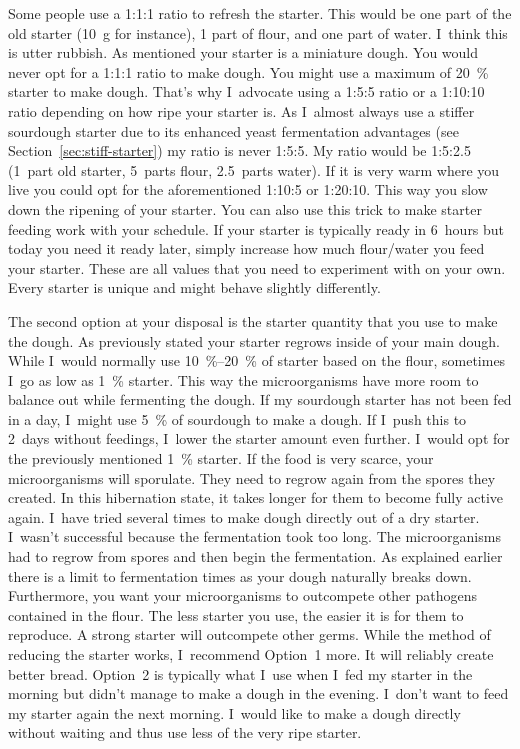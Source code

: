 Some people use a 1:1:1 ratio to refresh the starter. This would
be one part of the old starter (\qty{10}{\gram} for instance), 1 part of flour,
and one part of water. I~think this is utter rubbish. As mentioned
your starter is a miniature dough. You would never opt for a 1:1:1 ratio to
make dough. You might use a maximum of \qty{20}{\percent} starter to
make dough. That's why I~advocate using a 1:5:5 ratio or a
1:10:10 ratio depending on how ripe your starter is. As I~almost
always use a stiffer sourdough starter due to its enhanced
yeast fermentation advantages (see Section~\ref{sec:stiff-starter})
my ratio is never 1:5:5. My ratio would be 1:5:2.5 (1~part old starter,
5~parts flour, 2.5~parts water). If it is very warm where you live
you could opt for the aforementioned 1:10:5 or 1:20:10. This
way you slow down the ripening of your starter. You can also use this
trick to make starter feeding work with your schedule.
If your starter is typically ready in 6~hours but today you need it
ready later, simply increase how much flour/water you feed your starter.
These are all values that you need to experiment with on your own.
Every starter is unique and might behave slightly differently.

The second option at your disposal is the starter quantity that
you use to make the dough. As previously stated your starter
regrows inside of your main dough. While I~would normally use
\qtyrange{10}{20}{\percent} of starter based on the flour, sometimes I~go
as low as \qty{1}{\percent} starter. This way the microorganisms have
more room to balance out while fermenting the dough. If my sourdough
starter has not been fed in a day, I~might use \qty{5}{\percent} of sourdough
to make a dough. If I~push this to 2~days without feedings,
I~lower the starter amount even further. I~would opt for the
previously mentioned \qty{1}{\percent} starter. If the food is very scarce,
your microorganisms will sporulate. They need to regrow again
from the spores they created. In this hibernation state, it takes
longer for them to become fully active again. I~have tried
several times to make dough directly out of a dry starter.
I~wasn't successful because the fermentation took too long.
The microorganisms had to regrow from spores and then begin
the fermentation. As explained earlier there is a limit to
fermentation times as your dough naturally breaks down.
Furthermore, you want your microorganisms to outcompete
other pathogens contained in the flour. The less starter
you use, the easier it is for them to reproduce. A strong
starter will outcompete other germs. While the method of
reducing the starter works, I~recommend Option~1 more.
It will reliably create better bread. Option~2 is typically
what I~use when I~fed my starter in the morning but didn't
manage to make a dough in the evening. I~don't want to feed
my starter again the next morning. I~would like to make a dough
directly without waiting and thus use less of the very ripe starter.

